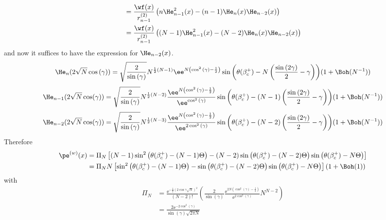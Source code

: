 {\begin{align}
	& = \frac{\wf(x)}{r_{n-1}^{(2)}} \left( n \He^2_{n-1}(x) - (n-1)  \He_{n}(x)\He_{n-2}(x)   \right) \\
	& = \frac{\wf(x)}{r_{n-1}^{(2)}} \left( (N-1) \He^2_{n-1}(x) - (N-2)  \He_{n}(x)\He_{n-2}(x)   \right) \\
\end{align}
and now it suffices to have the expression for $\He_{n-2}(x)$.
\begin{equation}
	\He_n(2\sqrt{N}\cos{(\gamma)}) = \sqrt{\frac{2}{\sin{(\gamma)}}}
	N^{\frac{1}{2} \left(N - 1\right)}
	\ee^{N\left(\cos^2{(\gamma)} - \frac{1}{2} \right)} 
	\sin{
		\left(
		\theta(\beta_c^+) 
		-N\left(\frac{\sin{(2\gamma)}}{2}
		-\gamma\right)
		\right)
	} 
	(1 + \Boh(N^{-1}))
\end{equation}
\begin{equation}
	\He_{n-1}(2\sqrt{N}\cos(\gamma)) = \sqrt{\frac{2}{\sin{(\gamma)}}}
	N^{\frac{1}{2} \left(N -2\right)}
	\frac{\ee^{N\left(\cos^2{(\gamma)} - \frac{1}{2} \right)}}{\ee^{\cos^2{(\gamma)}}}
	\sin{
		\left(
		\theta(\beta_c^+) 
		-(N-1)\left(\frac{\sin{(2\gamma)}}{2}
		-\gamma\right)
		\right)
	} 
	(1 + \Boh(N^{-1}))
\end{equation}
\begin{equation}
	\He_{n-2}(2\sqrt{N}\cos(\gamma)) = \sqrt{\frac{2}{\sin{(\gamma)}}}
	N^{\frac{1}{2} \left(N - 3\right)}
	\frac{\ee^{N\left(\cos^2{(\gamma)} - \frac{1}{2} \right)}}{\ee^{2\cos^2{(\gamma)}}}
	\sin{
		\left(
		\theta(\beta_c^+) 
		-(N-2)\left(\frac{\sin{(2\gamma)}}{2}
		-\gamma\right)
		\right)
	} 
	(1 + \Boh(N^{-1}))
\end{equation}
Therefore
\begin{align}
	\pe^{(w)}(x) & =  \Pi_N \left[(N-1) \sin^2{\left(\theta(\beta_c^+)-(N-1)\Theta \right)} - (N-2) \sin{\left(\theta(\beta_c^+)-(N-2)\Theta\right)}  \sin{\left(\theta(\beta_c^+)-N\Theta \right)} \right] \\
	& =  \Pi_N N \left[\sin^2{\left(\theta(\beta_c^+)-(N-1)\Theta \right)} - \sin{\left(\theta(\beta_c^+)-(N-2)\Theta\right)}  \sin{\left(\theta(\beta_c^+)-N\Theta \right)} \right] \left(1 + \Boh(1) \right)
\end{align}
with
\begin{align}
	\Pi_N & = \frac{\ee^{-\frac{1}{2}\left(2\cos{\gamma}\sqrt{N}\right)^2}}{(N-2)!} \left( \frac{2}{\sin(\gamma)} 	\frac{\ee^{2N\left(\cos^2{(\gamma)} - \frac{1}{2} \right)}}{\ee^{2\cos^2{(\gamma)}}} N^{N-2}\right) \\
	& = \frac{2 \ee^{-2\cos^2{(\gamma)}}}{\sin(\gamma) \sqrt{2\pi N}} \\

\end{align}}
